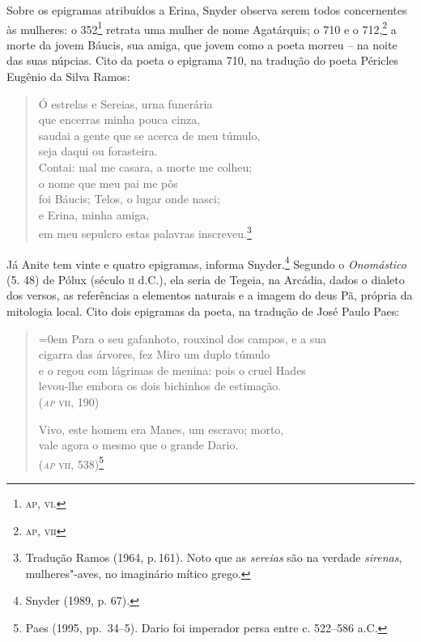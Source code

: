 Sobre os epigramas atribuídos a Erina, Snyder observa
serem todos concernentes às mulheres: o 352\footnote{\textsc{ap}, \textsc{vi}.}
retrata uma mulher de nome Agatárquis; o 710 e o 712,\footnote{\textsc{ap}, \textsc{vii}} a morte da jovem
Báucis, sua amiga, que jovem como a poeta morreu -- na noite das suas núpcias.
Cito da poeta o epigrama 710, na tradução do poeta Péricles Eugênio da Silva Ramos:

\begin{quote}
Ó estrelas e Sereias, urna funerária\\ 
\quad que encerras minha pouca cinza,\\
saudai a gente que se acerca de meu túmulo,\\
\quad seja daqui ou forasteira.\\
Contai: mal me casara, a morte me colheu;\\
\quad o nome que meu pai me pôs\\
foi Báucis; Telos, o lugar onde nasci;\\
\quad e Erina, minha amiga,\\
em meu sepulcro estas palavras inscreveu.\footnote{Tradução Ramos (1964, p.\,161). Noto que as \textit{sereias} são na verdade \textit{sirenas}, mulheres"-aves, no imaginário mítico grego.}
\end{quote}

Já Anite tem vinte e quatro
epigramas, informa Snyder.\footnote{ Snyder (1989, p. 67).} Segundo o \textit{Onomástico} (5. 48) de
Pólux (século \textsc{ii} d.C.), ela seria de Tegeia, na Arcádia, dados o dialeto dos
versos, as referências a elementos naturais e a imagem do deus Pã, própria da
mitologia local. Cito dois epigramas da poeta, na tradução de José Paulo Paes:

\begin{quote}\parindent=0em 
Para o seu gafanhoto, rouxinol dos campos, e a sua\\
cigarra das árvores, fez Miro um duplo túmulo\\
e o regou com lágrimas de menina: pois o cruel Hades\\
levou-lhe embora os dois bichinhos de estimação.\\
\mbox{}\hfill (\textsc{\textit{ap} vii}, 190)

\smallskip

Vivo, este homem era Manes, um escravo; morto,\\
vale agora o mesmo que o grande Dario.\\
\mbox{}\hfill (\textsc{\textit{ap} vii}, 538)\footnote{ Paes (1995, pp.~34--5). Dario foi imperador persa entre c. 522--586 a.C.}
\end{quote}

